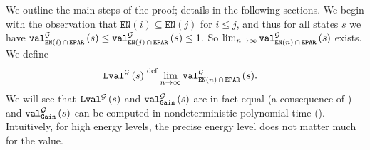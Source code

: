 \documentclass[a4paper,UKenglish,cleveref,autoref,thm-restate]{lipics-v2021}
\DeclareMathOperator{\Gain}{\mathtt{Gain}}
\newcommand{\Eparity}{\mathtt{EPAR}}
\newcommand{\en}{\mathtt{EN}}
\newcommand{\tendsto}{\rightarrow}
\newcommand{\+}[1]{\mathbb{#1}}
\newcommand{\?}[1]{\mathcal{#1}}
\newcommand{\eqby}[2][=]{\stackrel{\text{{\tiny{#2}}}}{#1}}
\newcommand{\eqdef}{\eqby{def}}
\newcommand{\game}{{\mathcal G}}
\newcommand{\s}{s}
\begin{document}
\smallskip
We outline the main steps of the proof; details in the following sections.
%
We begin with the observation that $\en(i) \subseteq \en(j)$ for
$i \le j$, and thus for all states $\s$ we have
$
    \valueof[\game][\en(i)\,\cap\,\Eparity]{\s} \le \valueof[\game][\en(j)\,\cap\,\Eparity]{\s} \le 1.
$ 
So $\lim_{n \tendsto \infty} \valueof[\game][\en(n)\,\cap\,\Eparity]{\s}$
exists. We define
\begin{align}
    \limval[\game]{\s} &\eqdef \lim_{n \tendsto \infty} \valueof[\game][\en(n)\,\cap\,\Eparity]{\s}. \label{def:limval_energy}
\end{align}
We will see that $\limval[\game]{\s}$ and $\valueof[\game][\Gain]{\s}$ are in fact equal
(a consequence of ) and $\valueof[\game][\Gain]{\s}$
can be computed in nondeterministic polynomial time ().
Intuitively, for high energy levels, the precise energy level does not matter
much for the value.
\end{document}
